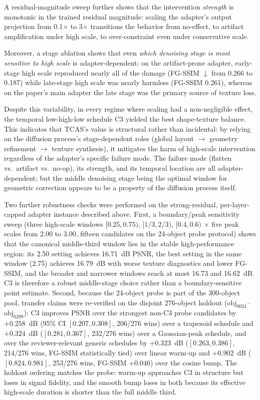 \documentclass[times,twocolumn,final]{elsarticle}
\providecommand{\DIFadd}[1]{{\protect\color{red} \sf #1}} %
\providecommand{\DIFaddbegin}{} %
\newcommand{\DIFaddincludegraphics}[2][]{{\color{red}\fbox{\DIFOincludegraphics[#1]{#2}}}} %
\DeclareRobustCommand{\DIFaddbegin}{\DIFOaddbegin \let\includegraphics\DIFaddincludegraphics} %
\begin{document}
A residual-magnitude sweep further shows that the intervention \emph{strength} is monotonic in the trained residual magnitude: scaling the adapter's output projection from 0.1$\times$ to 3$\times$ transitions the behavior from no-effect, to artifact amplification under high scale, to over-constraint even under conservative scale.

Moreover, a stage ablation shows that even \emph{which denoising stage is most sensitive to high scale} is adapter-dependent: on the artifact-prone adapter, early-stage high scale reproduced nearly all of the damage (FG-SSIM $\downarrow$ from 0.266 to 0.187) while late-stage high scale was nearly harmless (FG-SSIM 0.261), whereas on the paper's main adapter the late stage was the primary source of texture loss.

Despite this variability, in every regime where scaling had a non-negligible effect, the temporal low-high-low schedule C3 yielded the best shape-texture balance. This indicates that TCAS's value is structural rather than incidental: by relying on the diffusion process's stage-dependent roles (global layout $\to$ geometry refinement $\to$ texture synthesis), it mitigates the harm of high-scale intervention regardless of the adapter's specific failure mode. The failure mode (flatten vs.\ artifact vs.\ no-op), its strength, and its temporal location are all adapter-dependent; but the middle denoising stage being the optimal window for geometric correction appears to be a property of the diffusion process itself.

\DIFaddbegin \DIFadd{Two further robustness checks were performed on the strong-residual, per-layer-capped adapter instance described above. First, a boundary/peak sensitivity sweep (three high-scale windows $[0.25,0.75)$, $[1/3,2/3)$, $[0.4,0.6)$ $\times$ five peak scales from 2.00 to 3.00, fifteen candidates on the 24-object probe protocol) shows that the canonical middle-third window lies in the stable high-performance region: its 2.50 setting achieves 16.71~dB PSNR, the best setting in the same window (2.75) achieves 16.79~dB with worse texture diagnostics and lower FG-SSIM, and the broader and narrower windows reach at most 16.73 and 16.62~dB. C3 is therefore a robust middle-stage choice rather than a boundary-sensitive point estimate. Second, because the 24-object probe is part of the 300-object pool, transfer claims were re-verified on the disjoint 276-object holdout ($\mathrm{obj}_{0024}$--$\mathrm{obj}_{0299}$): C3 improves PSNR over the strongest non-C3 probe candidates by $+0.258$~dB (95\% CI $[0.207,0.308]$, 206/276 wins) over a trapezoid schedule and $+0.324$~dB ($[0.281,0.367]$, 232/276 wins) over a Gaussian-peak schedule, and over the reviewer-relevant generic schedules by $+0.323$~dB ($[0.263,0.386]$, 214/276 wins, FG-SSIM statistically tied) over linear warm-up and $+0.902$~dB ($[0.824,0.981]$, 253/276 wins, FG-SSIM $+0.046$) over the cosine bump. The holdout ordering matches the probe: warm-up approaches C3 in structure but loses in signal fidelity, and the smooth bump loses in both because its effective high-scale duration is shorter than the full middle third.
}
\end{document}
